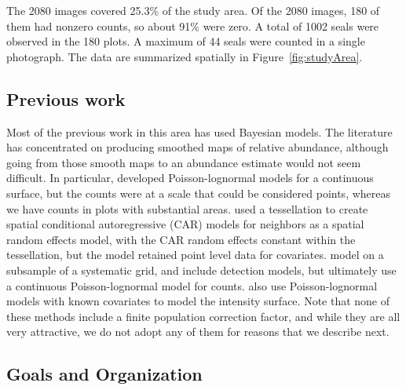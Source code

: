 \documentclass[12pt, titlepage]{article}\usepackage[]{graphicx}\usepackage[]{color}
\begin{document}
The 2080 images covered 25.3\% of the study area. Of the 2080 images, 180 of them had nonzero counts, so about 91\% were zero. A total of 1002  seals were observed in the 180 plots. A maximum of 44 seals were counted in a single photograph. The data are summarized spatially in Figure~\ref{fig:studyArea}. 

\subsection{Previous work} \label{sec:prevWork}

Most of the previous work in this area has used Bayesian models.  The literature has concentrated on producing smoothed maps of relative abundance, although going from those smooth maps to an abundance estimate would not seem difficult. In particular, \citet{Wikl:spat:2002} developed Poisson-lognormal models for a continuous surface, but the counts were at a scale that could be considered points, whereas we have counts in plots with substantial areas.  \citet{Thog:Saue:Knut:hier:2004} used a tessellation to create spatial conditional autoregressive (CAR) models \citep{Besa:spat:1974} for neighbors as a spatial random effects model, with the CAR random effects constant within the tessellation, but the model retained point level data for covariates. \citet{Royl:Kery:Gaut:Schm:hier:2007} model on a subsample of a systematic grid, and include detection models, but ultimately use a continuous Poisson-lognormal model for counts. \citet{Barb:Gelf:hier:2007} also use Poisson-lognormal models with known covariates to model the intensity surface.  Note that none of these methods include a finite population correction factor, and while they are all very attractive, we do not adopt any of them for reasons that we describe next.

\subsection{Goals and Organization} \label{sec:GoalsOrg}
\end{document}
